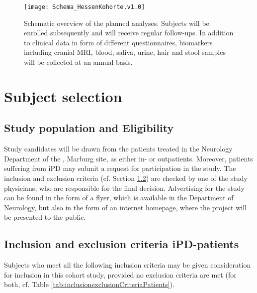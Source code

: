 \begin{figure}[h]
\label{fig2:scheme}
\centering
\texttt{[image: Schema\_HessenKohorte.v1.0]}
\caption{Schematic overview of the planned analyses. Subjects will be enrolled subsequently and will receive regular follow-ups. In addition to clinical data in form of different questionnaires, biomarkers including cranial \ac{MRI}, blood, saliva, urine, hair and stool samples will be collected at an annual basis.}
\end{figure}

\section{Subject selection}
\label{sec:study_selection}
\subsection{Study population and Eligibility}
\label{sec:study_population}
Study candidates will be drawn from the patients treated in the Neurology Department of the \UKGM, Marburg site, as either in- or outpatients. Moreover, patients suffering from \ac{iPD} may submit a request for participation in the study. The inclusion and exclusion criteria (cf. Section \ref{sec:inclusion_criteriaIPS}) are checked by one of the study physicians, who are responsible for the final decision. Advertising for the study can be found in the form of a flyer, which is available in the Department of Neurology, but also in the form of an internet homepage, where the project will be presented to the public.

\subsection{Inclusion and exclusion criteria \ac{iPD}-patients}
\label{sec:inclusion_criteriaIPS}
Subjects who meet all the following inclusion criteria may be given consideration for inclusion in this cohort study, provided no exclusion criteria are met (for both, cf. Table \ref{tab:inclusionexclusionCriteriaPatients}).

